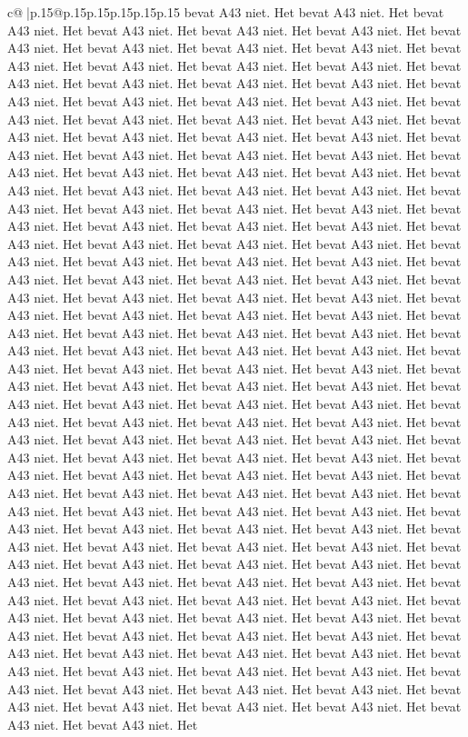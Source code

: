 \documentclass{article}
\begin{document}
{\begin{supertabular}{c@{$\;$}|p{.15\linewidth}@{}p{.15\linewidth}p{.15\linewidth}p{.15\linewidth}p{.15\linewidth}p{.15\linewidth}}
{{{bevat A43 niet. Het bevat A43 niet. Het bevat A43 niet. Het bevat A43 niet. Het bevat A43 niet. Het bevat A43 niet. Het bevat A43 niet. Het bevat A43 niet. Het bevat A43 niet. Het bevat A43 niet. Het bevat A43 niet. Het bevat A43 niet. Het bevat A43 niet. Het bevat A43 niet. Het bevat A43 niet. Het bevat A43 niet. Het bevat A43 niet. Het bevat A43 niet. Het bevat A43 niet. Het bevat A43 niet. Het bevat A43 niet. Het bevat A43 niet. Het bevat A43 niet. Het bevat A43 niet. Het bevat A43 niet. Het bevat A43 niet. Het bevat A43 niet. Het bevat A43 niet. Het bevat A43 niet. Het bevat A43 niet. Het bevat A43 niet. Het bevat A43 niet. Het bevat A43 niet. Het bevat A43 niet. Het bevat A43 niet. Het bevat A43 niet. Het bevat A43 niet. Het bevat A43 niet. Het bevat A43 niet. Het bevat A43 niet. Het bevat A43 niet. Het bevat A43 niet. Het bevat A43 niet. Het bevat A43 niet. Het bevat A43 niet. Het bevat A43 niet. Het bevat A43 niet. Het bevat A43 niet. Het bevat A43 niet. Het bevat A43 niet. Het bevat A43 niet. Het bevat A43 niet. Het bevat A43 niet. Het bevat A43 niet. Het bevat A43 niet. Het bevat A43 niet. Het bevat A43 niet. Het bevat A43 niet. Het bevat A43 niet. Het bevat A43 niet. Het bevat A43 niet. Het bevat A43 niet. Het bevat A43 niet. Het bevat A43 niet. Het bevat A43 niet. Het bevat A43 niet. Het bevat A43 niet. Het bevat A43 niet. Het bevat A43 niet. Het bevat A43 niet. Het bevat A43 niet. Het bevat A43 niet. Het bevat A43 niet. Het bevat A43 niet. Het bevat A43 niet. Het bevat A43 niet. Het bevat A43 niet. Het bevat A43 niet. Het bevat A43 niet. Het bevat A43 niet. Het bevat A43 niet. Het bevat A43 niet. Het bevat A43 niet. Het bevat A43 niet. Het bevat A43 niet. Het bevat A43 niet. Het bevat A43 niet. Het bevat A43 niet. Het bevat A43 niet. Het bevat A43 niet. Het bevat A43 niet. Het bevat A43 niet. Het bevat A43 niet. Het bevat A43 niet. Het bevat A43 niet. Het bevat A43 niet. Het bevat A43 niet. Het bevat A43 niet. Het bevat A43 niet. Het bevat A43 niet. Het bevat A43 niet. Het bevat A43 niet. Het bevat A43 niet. Het bevat A43 niet. Het bevat A43 niet. Het bevat A43 niet. Het bevat A43 niet. Het bevat A43 niet. Het bevat A43 niet. Het bevat A43 niet. Het bevat A43 niet. Het bevat A43 niet. Het bevat A43 niet. Het bevat A43 niet. Het bevat A43 niet. Het bevat A43 niet. Het bevat A43 niet. Het bevat A43 niet. Het bevat A43 niet. Het bevat A43 niet. Het bevat A43 niet. Het bevat A43 niet. Het bevat A43 niet. Het bevat A43 niet. Het bevat A43 niet. Het bevat A43 niet. Het bevat A43 niet. Het bevat A43 niet. Het bevat A43 niet. Het bevat A43 niet. Het bevat A43 niet. Het bevat A43 niet. Het bevat A43 niet. Het bevat A43 niet. Het bevat A43 niet. Het bevat A43 niet. Het bevat A43 niet. Het bevat A43 niet. Het bevat A43 niet. Het bevat A43 niet. Het bevat A43 niet. Het bevat A43 niet. Het bevat A43 niet. Het bevat A43 niet. Het bevat A43 niet. Het bevat A43 niet. Het bevat A43 niet. Het bevat A43 niet. Het bevat A43 niet. Het bevat A43 niet. Het bevat A43 niet. Het bevat A43 niet. Het bevat A43 niet. Het bevat A43 niet. Het bevat A43 niet. Het bevat A43 niet. Het bevat A43 niet. Het bevat A43 niet. Het bevat A43 niet. Het bevat A43 niet. Het }}}
\end{supertabular}}
\end{document}
